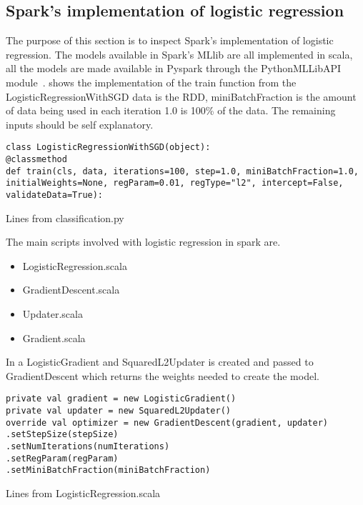 \subsection{Spark's implementation of logistic regression}\label{sec:sparklogreg}
The purpose of this section is to inspect Spark’s implementation of logistic regression.
The models available in Spark's MLlib are all implemented in scala, all the models are made available in Pyspark through the PythonMLLibAPI module~\cite{hadoopIntro}.
 shows the implementation of the train function from the LogisticRegressionWithSGD data is the RDD, miniBatchFraction is the amount of data being used in each iteration 1.0 is 100\% of the data. The remaining inputs should be self explanatory.   
\begin{listing}[H]
\begin{verbatim}
class LogisticRegressionWithSGD(object):
@classmethod
def train(cls, data, iterations=100, step=1.0, miniBatchFraction=1.0,
initialWeights=None, regParam=0.01, regType="l2", intercept=False,
validateData=True):
\end{verbatim}
\caption{Lines from classification.py}
\label{lst:py_logreg}
\end{listing}

The main scripts involved with logistic regression in spark are.
\begin{itemize}
\item LogisticRegression.scala
\item GradientDescent.scala
\item Updater.scala
\item Gradient.scala
\end{itemize}

In  a LogisticGradient and SquaredL2Updater is created and passed to GradientDescent which returns the weights needed to create the model.
\begin{listing}[H]
\begin{verbatim}
private val gradient = new LogisticGradient()
private val updater = new SquaredL2Updater()
override val optimizer = new GradientDescent(gradient, updater)
.setStepSize(stepSize)
.setNumIterations(numIterations)
.setRegParam(regParam)
.setMiniBatchFraction(miniBatchFraction)
\end{verbatim}
\caption{Lines from LogisticRegression.scala}
\label{lst:gd_logreg}
\end{listing}

